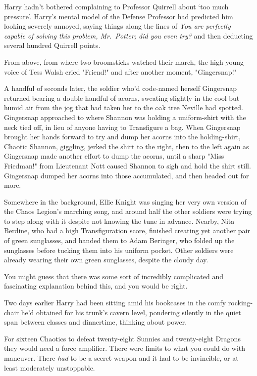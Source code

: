 Harry hadn't bothered complaining to Professor Quirrell about `too much 
pressure'. Harry's mental model of the Defense Professor had predicted him 
looking severely annoyed, saying things along the lines of \emph{You are 
perfectly capable of solving this problem, Mr.~Potter; did you even try?} and 
then deducting several hundred Quirrell points.

From above, from where two broomsticks watched their march, the high young 
voice of Tess Walsh cried "Friend!" and after another moment, "Gingersnap!"

A handful of seconds later, the soldier who'd code-named herself Gingersnap 
returned bearing a double handful of acorns, sweating slightly in the cool but 
humid air from the jog that had taken her to the oak tree Neville had spotted. 
Gingersnap approached to where Shannon was holding a uniform-shirt with the 
neck tied off, in lieu of anyone having to Transfigure a bag. When Gingersnap 
brought her hands forward to try and dump her acorns into the holding-shirt, 
Chaotic Shannon, giggling, jerked the shirt to the right, then to the left 
again as Gingersnap made another effort to dump the acorns, until a sharp "Miss 
Friedman!" from Lieutenant Nott caused Shannon to sigh and hold the shirt 
still. Gingersnap dumped her acorns into those accumulated, and then headed out 
for more.

Somewhere in the background, Ellie Knight was singing her very own version of 
the Chaos Legion's marching song, and around half the other soldiers were 
trying to step along with it despite not knowing the tune in advance. Nearby, 
Nita Berdine, who had a high Transfiguration score, finished creating yet 
another pair of green sunglasses, and handed them to Adam Beringer, who folded 
up the sunglasses before tucking them into his uniform pocket. Other soldiers 
were already wearing their own green sunglasses, despite the cloudy day.

You might guess that there was some sort of incredibly complicated and 
fascinating explanation behind this, and you would be right.

Two days earlier Harry had been sitting amid his bookcases in the comfy 
rocking-chair he'd obtained for his trunk's cavern level, pondering silently in 
the quiet span between classes and dinnertime, thinking about power.

For sixteen Chaotics to defeat twenty-eight Sunnies and twenty-eight Dragons 
they would need a force amplifier. There were limits to what you could do with 
maneuver. There \emph{had} to be a secret weapon and it had to be invincible, 
or at least moderately unstoppable.

